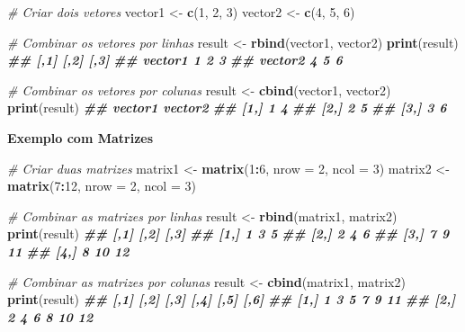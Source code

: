 \documentclass[
]{book}
\newenvironment{Shaded}{\begin{snugshade}}{\end{snugshade}}
\newcommand{\AttributeTok}[1]{\textcolor[rgb]{0.13,0.29,0.53}{#1}}
\newcommand{\CommentTok}[1]{\textcolor[rgb]{0.56,0.35,0.01}{\textit{#1}}}
\newcommand{\DecValTok}[1]{\textcolor[rgb]{0.00,0.00,0.81}{#1}}
\newcommand{\DocumentationTok}[1]{\textcolor[rgb]{0.56,0.35,0.01}{\textbf{\textit{#1}}}}
\newcommand{\FunctionTok}[1]{\textcolor[rgb]{0.13,0.29,0.53}{\textbf{#1}}}
\newcommand{\NormalTok}[1]{#1}
\newcommand{\OtherTok}[1]{\textcolor[rgb]{0.56,0.35,0.01}{#1}}
\newcommand{\SpecialCharTok}[1]{\textcolor[rgb]{0.81,0.36,0.00}{\textbf{#1}}}
\begin{document}
\begin{Shaded}
\begin{Highlighting}[]
\CommentTok{\# Criar dois vetores}
\NormalTok{vector1 }\OtherTok{\textless{}{-}} \FunctionTok{c}\NormalTok{(}\DecValTok{1}\NormalTok{, }\DecValTok{2}\NormalTok{, }\DecValTok{3}\NormalTok{)}
\NormalTok{vector2 }\OtherTok{\textless{}{-}} \FunctionTok{c}\NormalTok{(}\DecValTok{4}\NormalTok{, }\DecValTok{5}\NormalTok{, }\DecValTok{6}\NormalTok{)}

\CommentTok{\# Combinar os vetores por linhas}
\NormalTok{result }\OtherTok{\textless{}{-}} \FunctionTok{rbind}\NormalTok{(vector1, vector2)}
\FunctionTok{print}\NormalTok{(result)}
\DocumentationTok{\#\#         [,1] [,2] [,3]}
\DocumentationTok{\#\# vector1    1    2    3}
\DocumentationTok{\#\# vector2    4    5    6}

\CommentTok{\# Combinar os vetores por colunas}
\NormalTok{result }\OtherTok{\textless{}{-}} \FunctionTok{cbind}\NormalTok{(vector1, vector2)}
\FunctionTok{print}\NormalTok{(result)}
\DocumentationTok{\#\#      vector1 vector2}
\DocumentationTok{\#\# [1,]       1       4}
\DocumentationTok{\#\# [2,]       2       5}
\DocumentationTok{\#\# [3,]       3       6}
\end{Highlighting}
\end{Shaded}

\textbf{Exemplo com Matrizes}

\begin{Shaded}
\begin{Highlighting}[]
\CommentTok{\# Criar duas matrizes}
\NormalTok{matrix1 }\OtherTok{\textless{}{-}} \FunctionTok{matrix}\NormalTok{(}\DecValTok{1}\SpecialCharTok{:}\DecValTok{6}\NormalTok{, }\AttributeTok{nrow =} \DecValTok{2}\NormalTok{, }\AttributeTok{ncol =} \DecValTok{3}\NormalTok{)}
\NormalTok{matrix2 }\OtherTok{\textless{}{-}} \FunctionTok{matrix}\NormalTok{(}\DecValTok{7}\SpecialCharTok{:}\DecValTok{12}\NormalTok{, }\AttributeTok{nrow =} \DecValTok{2}\NormalTok{, }\AttributeTok{ncol =} \DecValTok{3}\NormalTok{)}

\CommentTok{\# Combinar as matrizes por linhas}
\NormalTok{result }\OtherTok{\textless{}{-}} \FunctionTok{rbind}\NormalTok{(matrix1, matrix2)}
\FunctionTok{print}\NormalTok{(result)}
\DocumentationTok{\#\#      [,1] [,2] [,3]}
\DocumentationTok{\#\# [1,]    1    3    5}
\DocumentationTok{\#\# [2,]    2    4    6}
\DocumentationTok{\#\# [3,]    7    9   11}
\DocumentationTok{\#\# [4,]    8   10   12}

\CommentTok{\# Combinar as matrizes por colunas}
\NormalTok{result }\OtherTok{\textless{}{-}} \FunctionTok{cbind}\NormalTok{(matrix1, matrix2)}
\FunctionTok{print}\NormalTok{(result)}
\DocumentationTok{\#\#      [,1] [,2] [,3] [,4] [,5] [,6]}
\DocumentationTok{\#\# [1,]    1    3    5    7    9   11}
\DocumentationTok{\#\# [2,]    2    4    6    8   10   12}
\end{Highlighting}
\end{Shaded}
\end{document}
